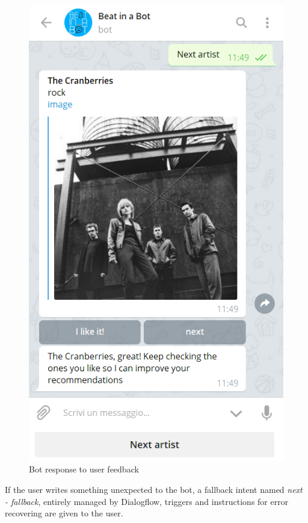 \documentclass[b5paper,10pt,twoside,cucitura]{toptesi}
\begin{document}
\begin{figure}[ht]
\centering
\includegraphics[scale=0.71]{bot_likeit.png}
\caption{Bot response to user feedback}
\end{figure}

\newpage

\noindent
If the user writes something unexpected to the bot, a fallback intent named \textit{next - fallback}, entirely managed by Dialogflow, triggers and instructions for error recovering are given to the user.
\end{document}
